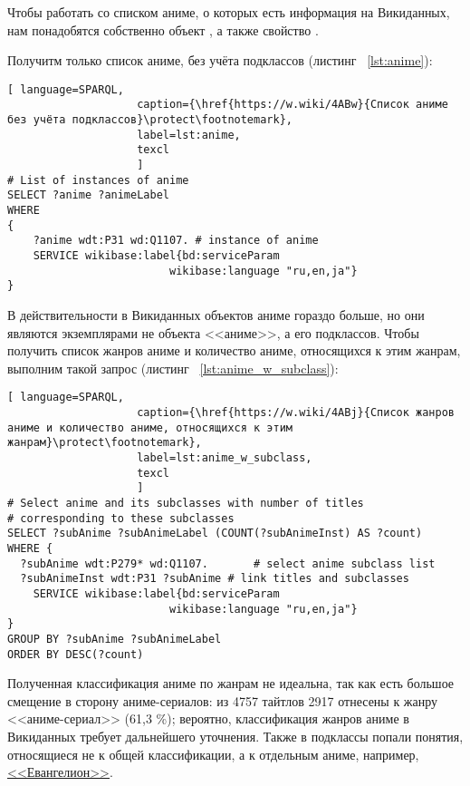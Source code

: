 Чтобы работать со списком аниме, о которых есть информация на Викиданных, нам понадобятся собственно объект , а также свойство .

Получитм только список аниме, без учёта подклассов (листинг ~\protect\ref{lst:anime}):

\begin{lstlisting}[ language=SPARQL, 
                    caption={\href{https://w.wiki/4ABw}{Список аниме без учёта подклассов}\protect\footnotemark},
                    label=lst:anime,
                    texcl 
                    ]
# List of instances of anime
SELECT ?anime ?animeLabel
WHERE
{
    ?anime wdt:P31 wd:Q1107. # instance of anime
    SERVICE wikibase:label{bd:serviceParam
					     wikibase:language "ru,en,ja"}
}
\end{lstlisting}%

В действительности в Викиданных объектов аниме гораздо больше, но они являются экземплярами не объекта <<аниме>>, а его подклассов. Чтобы получить список жанров аниме и количество аниме, относящихся к этим жанрам, выполним такой запрос (листинг ~\protect\ref{lst:anime_w_subclass}):

\begin{lstlisting}[ language=SPARQL, 
                    caption={\href{https://w.wiki/4ABj}{Список жанров аниме и количество аниме, относящихся к этим жанрам}\protect\footnotemark},
                    label=lst:anime_w_subclass,
                    texcl 
                    ]
# Select anime and its subclasses with number of titles
# corresponding to these subclasses
SELECT ?subAnime ?subAnimeLabel (COUNT(?subAnimeInst) AS ?count)
WHERE {
  ?subAnime wdt:P279* wd:Q1107.       # select anime subclass list
  ?subAnimeInst wdt:P31 ?subAnime # link titles and subclasses
    SERVICE wikibase:label{bd:serviceParam
					     wikibase:language "ru,en,ja"}
}
GROUP BY ?subAnime ?subAnimeLabel
ORDER BY DESC(?count)
\end{lstlisting}%

Полученная классификация аниме по жанрам не идеальна, так как есть большое смещение в сторону аниме-сериалов: из 4757 тайтлов 2917 отнесены к жанру <<аниме-сериал>> (61,3 \%); вероятно, классификация жанров аниме в Викиданных требует дальнейшего уточнения. Также в подклассы попали понятия, относящиеся не к общей классификации, а к отдельным аниме, например, \href{https://clck.ru/9cFfS}{<<Евангелион>>}.

